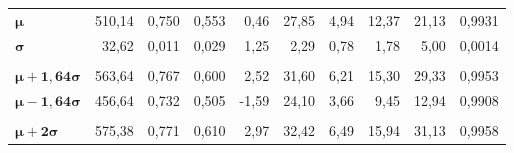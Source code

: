 \begin{table}[htb]
\begin{tabulary}{0.97\textwidth}{lRRRRRRrrR}
	$ \bm{\mu} $        & 510,14                   & 0,750                                                              & 0,553                                    & 0,46                                                   & 27,85                       & 4,94                              & 12,37             & 21,13             & 0,9931                                                           \\
	$ \bm{\sigma} $   & 32,62                    & 0,011                                                              & 0,029                                    & 1,25                                                   & 2,29                        & 0,78                              & 1,78              & 5,00              & 0,0014                                                           \\
	                      &                          &                                                                    &                                          &                                                        &                             &                                   &                   &                   &  \\
	$ \bm{\mu+1,64\sigma} $ & 563,64                   & 0,767                                                              & 0,600                                    & 2,52                                                   & 31,60                       & 6,21                              & 15,30             & 29,33             & 0,9953                                                           \\
	$ \bm{\mu-1,64\sigma} $ & 456,64                   & 0,732                                                              & 0,505                                    & -1,59                                                  & 24,10                       & 3,66                              & 9,45              & 12,94             & 0,9908                                                           \\
	\textbf{}             &                          &                                                                    &                                          &                                                        &                             &                                   &                   &                   &  \\
	$ \bm{\mu+2\sigma} $    & 575,38                   & 0,771                                                              & 0,610                                    & 2,97                                                   & 32,42                       & 6,49                              & 15,94             & 31,13             & 0,9958                                                           \\

\end{tabulary}
\end{table}
